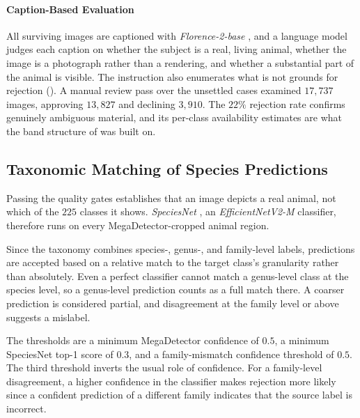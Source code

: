 \paragraph{Caption-Based Evaluation}
All surviving images are captioned with \textit{Florence-2-base} \cite{xiaoFlorence2AdvancingUnified2023}, and a language model judges each caption on whether the subject is a real, living animal, whether the image is a photograph rather than a rendering, and whether a substantial part of the animal is visible. The instruction also enumerates what is not grounds for rejection (). A manual review pass over the unsettled cases examined $17{,}737$ images, approving $13{,}827$ and declining $3{,}910$. The $22\%$ rejection rate confirms genuinely ambiguous material, and its per-class availability estimates are what the band structure of  was built on.

\subsection{Taxonomic Matching of Species Predictions}\label{sec:speciesnet_matching}

Passing the quality gates establishes that an image depicts a real animal, not which of the $225$ classes it shows. \textit{SpeciesNet} \cite{gadotCropNotCrop2024a}, an \textit{EfficientNetV2-M} \cite{tanEfficientNetV2SmallerModels2021} classifier, therefore runs on every MegaDetector-cropped animal region.

Since the taxonomy combines species-, genus-, and family-level labels, predictions are accepted based on a relative match to the target class's granularity rather than absolutely. Even a perfect classifier cannot match a genus-level class at the species level, so a genus-level prediction counts as a full match there. A coarser prediction is considered partial, and disagreement at the family level or above suggests a mislabel.

The thresholds are a minimum MegaDetector confidence of $0.5$, a minimum SpeciesNet top-1 score of $0.3$, and a family-mismatch confidence threshold of $0.5$. The third threshold inverts the usual role of confidence. For a family-level disagreement, a higher confidence in the classifier makes rejection more likely since a confident prediction of a different family indicates that the source label is incorrect.

